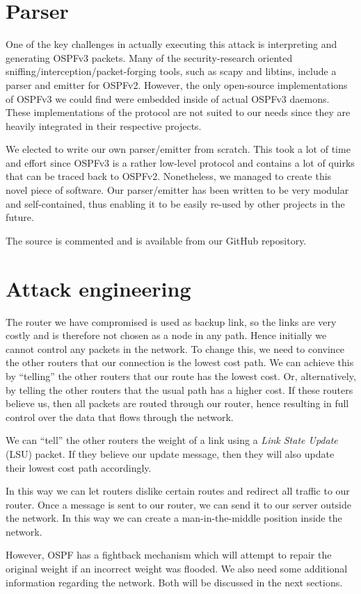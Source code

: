 \documentclass[11pt,a4paper,oneside]{article}
\newcommand{\lsection}[2]{\section{#1}\label{sec:#2}}
\begin{document}
    \lsection{Parser}{parser}
    One of the key challenges in actually executing this attack is interpreting and generating OSPFv3 packets.
    Many of the security-research oriented sniffing/interception/packet-forging tools, such as scapy and libtins, include a parser and emitter for OSPFv2.
    However, the only open-source implementations of OSPFv3 we could find were embedded inside of actual OSPFv3 daemons.
    These implementations of the protocol are not suited to our needs since they are heavily integrated in their respective projects.

    We elected to write our own parser/emitter from scratch.
    This took a lot of time and effort since OSPFv3 is a rather low-level protocol and contains a lot of quirks that can be traced back to OSPFv2.
    Nonetheless, we managed to create this novel piece of software.
    Our parser/emitter has been written to be very modular and self-contained, thus enabling it to be easily re-used by other projects in the future.

    The source is commented and is available from our GitHub repository. \cite{wiki}

    \lsection{Attack engineering}{attack}
    The router we have compromised is used as backup link, so the links are very costly and is therefore not chosen as a node in any path.
    Hence initially we cannot control any packets in the network.
    To change this, we need to convince the other routers that our connection is the lowest cost path.
    We can achieve this by ``telling'' the other routers that our route has the lowest cost.
    Or, alternatively, by telling the other routers that the usual path has a higher cost.
    If these routers believe us, then all packets are routed through our router, hence resulting in full control over the data that flows through the network.

    We can ``tell'' the other routers the weight of a link using a \textit{Link State Update} (LSU) packet.
    If they believe our update message, then they will also update their lowest cost path accordingly.

    In this way we can let routers dislike certain routes and redirect all traffic to our router.
    Once a message is sent to our router, we can send it to our server outside the network.
    In this way we can create a man-in-the-middle position inside the network.

    However, OSPF has a fightback mechanism which will attempt to repair the original weight if an incorrect weight was flooded.
    We also need some additional information regarding the network.
    Both will be discussed in the next sections.
\end{document}
